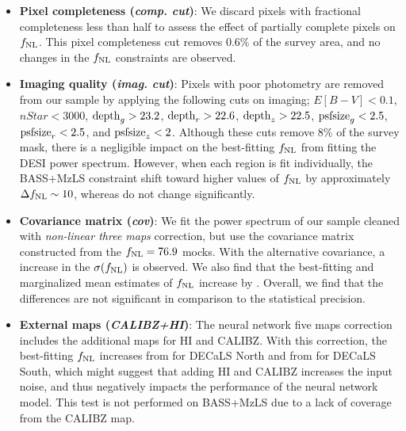 \begin{itemize}[itemindent=*]
\item \textbf{Pixel completeness (\textit{comp. cut})}: We discard pixels with fractional completeness less than half to assess the effect of partially complete pixels on $f_{\rm NL}$. This pixel completeness cut removes $0.6\%$ of the survey area, and no changes in the $f_{\rm NL}$ constraints are observed.

\item \textbf{Imaging quality (\textit{imag. cut})}: Pixels with poor photometry are removed from our sample by applying the following cuts on imaging; $E[B-V]<0.1$, $nStar < 3000$, ${\rm depth}_{g} > 23.2$, ${\rm depth}_{r} > 22.6$, ${\rm depth}_{z} > 22.5$, ${\rm psfsize}_{g}<2.5$, ${\rm psfsize}_{r}<2.5$, and ${\rm psfsize}_{z}<2$. Although these cuts remove $8\%$ of the survey mask, there is a negligible impact on the best-fitting $f_{\rm NL}$ from fitting the DESI power spectrum. However, when each region  is fit individually, the BASS+MzLS constraint shift toward higher values of $f_{\rm NL}$ by approximately $\Delta f_{\rm NL} \sim 10$,  whereas    do not change significantly. 

\item \textbf{Covariance matrix (\textit{cov})}: We fit the power spectrum of our sample cleaned with \textit{non-linear three maps} correction, but use the covariance matrix constructed from the $f_{\rm NL}=76.9$ mocks. With the alternative covariance, a  increase in the $\sigma(f_{\rm NL})$ is observed. We also find that the best-fitting and marginalized mean estimates of $f_{\rm NL}$ increase by . Overall, we find that the differences are not significant in comparison to the statistical precision.

\item \textbf{External maps (\textit{CALIBZ+HI})}: The neural network five maps correction includes the additional maps for HI and CALIBZ. With this correction, the best-fitting $f_{\rm NL}$ increases from  for DECaLS North and from  for DECaLS South, which might suggest that adding HI and CALIBZ increases the input noise, and thus negatively impacts the performance of the neural network model. This test is not performed on BASS+MzLS due to a lack of coverage from the CALIBZ map. 


\end{itemize}
